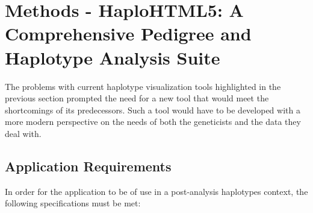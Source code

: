\chapter[Methods - HaploHTML5: A Comprehensive Pedigree and\\Haplotype Analysis Suite]{Methods - HaploHTML5: A\\Comprehensive Pedigree and\\Haplotype Analysis Suite}

\vspace{10pt}
The problems with current haplotype visualization tools highlighted in the previous section prompted the need for a new tool that would meet the shortcomings of its predecessors. Such a tool would have to be developed with a more modern perspective on the needs of both the geneticists and the data they deal with.

\section{Application Requirements}

In order for the application to be of use in a post-analysis haplotypes context, the following specifications must be met:

